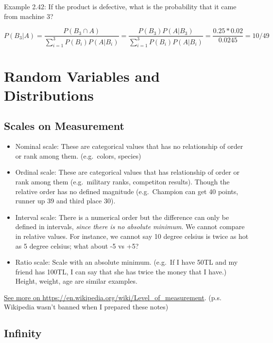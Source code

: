 \documentclass[]{book}
\providecommand{\tightlist}{%
  \setlength{\itemsep}{0pt}\setlength{\parskip}{0pt}}
\theoremstyle{definition}
\theoremstyle{definition}
\theoremstyle{definition}
\theoremstyle{remark}
\begin{document}
Example 2.42: If the product is defective, what is the probability that
it came from machine 3?

\[P(B_3|A) = \dfrac{P(B_3 \cap A)}{\sum_{i=1}^3 P(B_i)P(A|B_i)} = \dfrac{P(B_3)P(A|B_3)}{\sum_{i=1}^3 P(B_i)P(A|B_i)} = \dfrac{0.25 * 0.02}{0.0245} = 10/49\]

\hypertarget{random-variables-and-distributions}{%
\chapter{Random Variables and
Distributions}\label{random-variables-and-distributions}}

\hypertarget{scales-on-measurement}{%
\section{Scales on Measurement}\label{scales-on-measurement}}

\begin{itemize}
\tightlist
\item
  Nominal scale: These are categorical values that has no relationship
  of order or rank among them. (e.g.~colors, species)
\item
  Ordinal scale: These are categorical values that has relationship of
  order or rank among them (e.g.~military ranks, competiton results).
  Though the relative order has no defined magnitude (e.g.~Champion can
  get 40 points, runner up 39 and third place 30).
\item
  Interval scale: There is a numerical order but the difference can only
  be defined in intervals, \emph{since there is no absolute minimum}. We
  cannot compare in relative values. For instance, we cannot say 10
  degree celsius is twice as hot as 5 degree celsius; what about -5 vs
  +5?
\item
  Ratio scale: Scale with an absolute minimum. (e.g.~If I have 50TL and
  my friend has 100TL, I can say that she has twice the money that I
  have.) Height, weight, age are similar examples.
\end{itemize}

\href{https://en.wikipedia.org/wiki/Level_of_measurement}{See more on
https://en.wikipedia.org/wiki/Level\_of\_measurement}. (p.s. Wikipedia
wasn't banned when I prepared these notes)

\hypertarget{infinity}{%
\section{Infinity}\label{infinity}}
\end{document}

